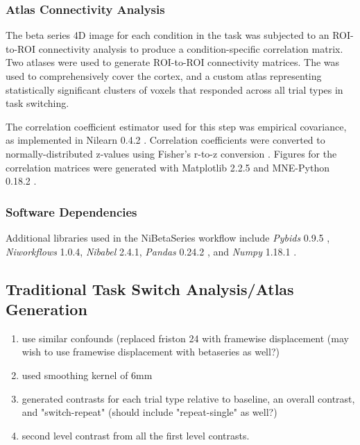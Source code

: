 \documentclass[10pt,letterpaper]{article}
\begin{document}
\hypertarget{atlas-connectivity-analysis}{%
\subsubsection{Atlas Connectivity
Analysis}\label{atlas-connectivity-analysis}}

The beta series 4D image for each condition in the task was subjected to
an ROI-to-ROI connectivity analysis to produce a condition-specific
correlation matrix.
Two atlases were used to generate ROI-to-ROI connectivity matrices.
The \cite[Schaefer Atlas (400 parcels, 17 networks)]{Schaefer2017} was
used to comprehensively cover the cortex, and a custom atlas representing
statistically significant clusters of voxels that responded across all trial types
in task switching.

The correlation coefficient estimator used for this
step was empirical covariance, as implemented in Nilearn 0.4.2
\cite{Abraham2014}. Correlation coefficients were converted to
normally-distributed z-values using Fisher's r-to-z conversion
\cite{Fisher1915}. Figures for the correlation matrices were generated
with Matplotlib 2.2.5 \cite{Hunter2007} and MNE-Python 0.18.2
\cite{Gramfort2013, Gramfort2014}.

\hypertarget{software-dependencies}{%
\subsubsection{Software Dependencies}\label{software-dependencies}}

Additional libraries used in the NiBetaSeries workflow include
\emph{Pybids} 0.9.5 \cite{Yarkoni2019}, \emph{Niworkflows} 1.0.4,
\emph{Nibabel} 2.4.1, \emph{Pandas} 0.24.2 \cite{McKinney2010}, and
\emph{Numpy} 1.18.1 \cite{VanDerWalt2011, Oliphant2006}.

\subsection*{Traditional Task Switch Analysis/Atlas Generation}
\begin{enumerate}
  \item use similar confounds (replaced friston 24 with framewise displacement
        (may wish to use framewise displacement with betaseries as well?)
  \item used smoothing kernel of 6mm
  \item generated contrasts for each trial type relative to baseline,
        an overall contrast, and "switch-repeat" (should include "repeat-single" as well?)
  \item second level contrast from all the first level contrasts.
\end{enumerate}
\end{document}
